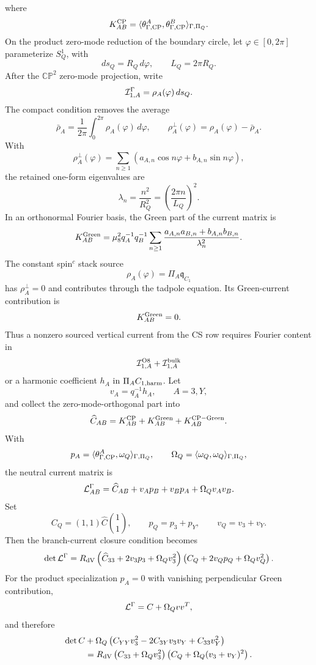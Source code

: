 \documentclass[11pt]{article}
\theoremstyle{definition}
\theoremstyle{remark}
\newcommand{\CP}{\mathbb{CP}}
\begin{document}
where
\[
  K_{AB}^{\rm CP}
  =
  \langle\theta_{\Gamma,{\rm CP}}^A,
  \theta_{\Gamma,{\rm CP}}^B\rangle_{\Gamma,\Pi_Q}.
\]
On the product zero-mode reduction of the boundary circle, let
\(\varphi\in[0,2\pi]\) parameterize \(S^1_Q\), with
\[
  ds_Q=R_Q\,d\varphi,
  \qquad
  L_Q=2\pi R_Q .
\]
After the \(\CP^2\) zero-mode projection, write
\[
  {\cal I}_{1,A}^{\Gamma}
  =
  \rho_A(\varphi)\,ds_Q .
\]
The compact condition removes the average
\[
  \bar\rho_A=\frac1{2\pi}\int_0^{2\pi}\rho_A(\varphi)\,d\varphi,
  \qquad
  \rho_A^\perp(\varphi)=\rho_A(\varphi)-\bar\rho_A .
\]
With
\[
  \rho_A^\perp(\varphi)
  =
  \sum_{n\ge1}
  \left(a_{A,n}\cos n\varphi+b_{A,n}\sin n\varphi\right),
\]
the retained one-form eigenvalues are
\[
  \lambda_n=\frac{n^2}{R_Q^2}
  =
  \left(\frac{2\pi n}{L_Q}\right)^2 .
\]
In an orthonormal Fourier basis, the Green part of the current matrix is
\[
  K_{AB}^{\rm Green}
  =
  \mu_8^2q_A^{-1}q_B^{-1}
  \sum_{n\ge1}
  \frac{a_{A,n}a_{B,n}+b_{A,n}b_{B,n}}{\lambda_n^2}.
\]
The constant spin\(^c\) stack source
\[
  \rho_A(\varphi)=\Pi_A\mathfrak q_{C_1}
\]
has \(\rho_A^\perp=0\) and contributes through the tadpole equation.  Its
Green-current contribution is
\[
  K_{AB}^{\rm Green}=0 .
\]
Thus a nonzero sourced vertical current from the CS row requires Fourier
content in
\[
  {\cal I}_{1,A}^{\rm O8}+{\cal I}_{1,A}^{\rm bulk}
\]
or a harmonic coefficient \(h_A\) in \(\Pi_A C_{1,{\rm harm}}\).
Let
\[
  v_A=q_A^{-1}h_A,\qquad A=3,Y,
\]
and collect the zero-mode-orthogonal part into
\[
  \widehat C_{AB}
  =
  K_{AB}^{\rm CP}
  +K_{AB}^{\rm Green}
  +K_{AB}^{\rm CP-Green}.
\]
With
\[
  p_A=\langle\theta_{\Gamma,{\rm CP}}^A,\omega_Q\rangle_{\Gamma,\Pi_Q},
  \qquad
  \Omega_Q=\langle\omega_Q,\omega_Q\rangle_{\Gamma,\Pi_Q},
\]
the neutral current matrix is
\[
  {\cal L}_{AB}^{\Gamma}
  =
  \widehat C_{AB}
  +v_Ap_B+v_Bp_A+\Omega_Qv_Av_B .
\]
Set
\[
  C_Q=(1,1)\widehat C\binom{1}{1},
  \qquad
  p_Q=p_3+p_Y,
  \qquad
  v_Q=v_3+v_Y .
\]
Then the branch-current closure condition becomes
\[
  \det{\cal L}^{\Gamma}
  =
  R_{\rm dV}
  \left(\widehat C_{33}+2v_3p_3+\Omega_Qv_3^2\right)
  \left(C_Q+2v_Qp_Q+\Omega_Qv_Q^2\right).
\]
For the product specialization \(p_A=0\) with vanishing perpendicular Green
contribution,
\[
  {\cal L}^{\Gamma}=C+\Omega_Qvv^T,
\]
and therefore
\[
\begin{aligned}
  \det C
  &+\Omega_Q
  \left(C_{YY}v_3^2-2C_{3Y}v_3v_Y+C_{33}v_Y^2\right)\\
  &=
  R_{\rm dV}
  \left(C_{33}+\Omega_Qv_3^2\right)
  \left(C_Q+\Omega_Q(v_3+v_Y)^2\right).
\end{aligned}
\]
\end{document}
